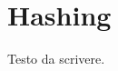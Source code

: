 
\ifsubfile
\usepackage{../settings/subfile}
\setcounter{chapter}{8}


\fi
\chapter{Hashing}

Testo da scrivere.

\ifsubfile

\fi
